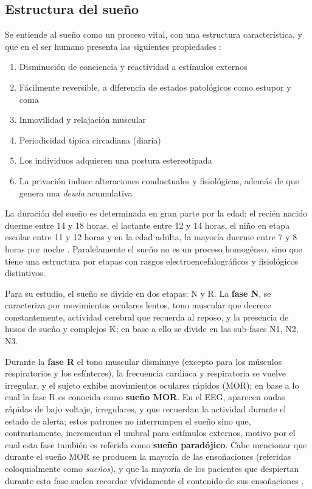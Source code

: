 
\subsection{Estructura del sueño}

Se entiende al sueño como un proceso vital, con una estructura característica, y que en el ser 
humano presenta las siguientes propiedades \cite{CarrilloMora}:
\begin{enumerate}
\item Disminución de conciencia y reactividad a estímulos externos
\item Fácilmente reversible, a diferencia de estados patológicos como estupor y coma
\item Inmovilidad y relajación muscular
\item Periodicidad típica circadiana (diaria)
\item Los individuos adquieren una postura estereotipada
\item La privación induce alteraciones conductuales y 
fisiológicas, además de que genera una \textit{deuda} acumulativa
\end{enumerate}

La duración del sueño es determinada en gran parte por la edad; el recién nacido duerme entre 14 y 
18 horas, el lactante entre 12 y 14 horas, el niño en etapa escolar entre 11 y 12 horas y en la 
edad adulta, la mayoría duerme entre 7 y 8 horas por noche \cite{Contreras13}.
%
Paralelamente el sueño no es un proceso homogéneo, sino que tiene una estructura por etapas con 
rasgos electroencefalográficos y fisiológicos distintivos.

Para su estudio, el sueño se divide en dos etapas: N y R.
%
La \textbf{fase N}, se caracteriza por movimientos oculares lentos, tono muscular que decrece 
constantemente, actividad cerebral que recuerda al reposo, y la presencia de husos de sueño y 
complejos K; en base a ello se divide en las sub-fases N1, N2, N3.

Durante la \textbf{fase R} el tono muscular disminuye (excepto para los músculos respiratorios y 
los esfínteres), la frecuencia cardíaca y respiratoria se vuelve irregular, y el sujeto exhibe 
movimientos oculares rápidos (MOR); en base a lo cual la fase R es conocida como \textbf{sueño 
MOR}.
%
En el EEG, aparecen ondas rápidas de bajo voltaje, irregulares, y que recuerdan la actividad 
durante el estado de alerta; estos patrones no interrumpen el sueño sino que, contrariamente,
incrementan el umbral para estímulos externos, motivo por el cual esta fase también es referida 
como \textbf{sueño paradójico}.
%
Cabe mencionar que durante el sueño MOR se producen la mayoría de las ensoñaciones (referidas 
coloquialmente como \textit{sueños}), y que la mayoría de los pacientes que despiertan durante esta 
fase suelen recordar vívidamente el contenido de sus ensoñaciones \cite{Rosales14}.

